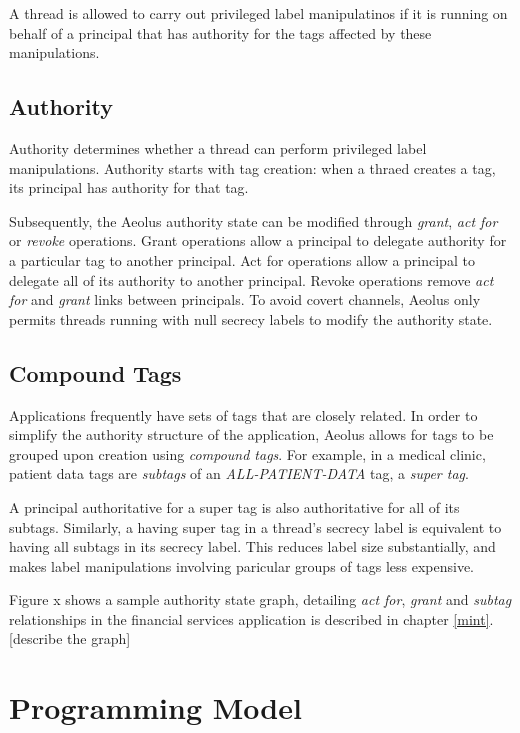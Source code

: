A thread is allowed to carry out privileged label manipulatinos if it is running on behalf of a principal that has authority for the tags affected by these manipulations.

\subsection{Authority}\label{auth}

Authority determines whether a thread can perform privileged label manipulations. Authority starts with tag creation: when a thraed creates a tag, its principal has authority for that tag.

Subsequently, the Aeolus authority state can be modified through \emph{grant}, \emph{act for} or \emph{revoke} operations. Grant operations allow a principal to delegate authority for a particular tag to another principal. Act for operations allow a principal to delegate all of its authority to another principal. Revoke operations remove \emph{act for} and \emph{grant} links between principals. To avoid covert channels, Aeolus only permits threads running with null secrecy labels to modify the authority state.

\subsection{Compound Tags}

Applications frequently have sets of tags that are closely related. In order to simplify the authority structure of the application, Aeolus allows for tags to be grouped upon creation using \emph{compound tags}. For example, in a medical clinic, patient data tags are \emph{subtags} of an \emph{ALL-PATIENT-DATA} tag, a \emph{super tag}.

A principal authoritative for a super tag is also authoritative for all of its subtags. Similarly, a having super tag in a thread's secrecy label is equivalent to having all subtags in its secrecy label. This reduces label size substantially, and makes label manipulations involving paricular groups of tags less expensive.

Figure x shows a sample authority state graph, detailing \emph{act for}, \emph{grant} and \emph{subtag} relationships in the financial services application is described in chapter \ref{mint}. [describe the graph]

\section{Programming Model}

